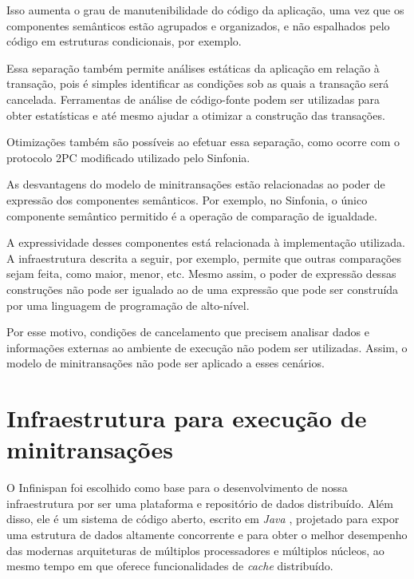 \documentclass[11pt,twoside,a4paper]{book}
\begin{document}
Isso aumenta o grau de manutenibilidade do código da aplicação, uma vez que os componentes semânticos estão agrupados e organizados, e não espalhados pelo código em estruturas condicionais, por exemplo.

Essa separação também permite análises estáticas da aplicação em relação à transação, pois é simples identificar as condições sob as quais a transação será cancelada. Ferramentas de análise de código-fonte podem ser utilizadas para obter estatísticas e até mesmo ajudar a otimizar a construção das transações.

Otimizações também são possíveis ao efetuar essa separação, como ocorre com o protocolo 2PC modificado utilizado pelo Sinfonia. 

As desvantagens do modelo de minitransações estão relacionadas ao poder de expressão dos componentes semânticos. Por exemplo, no Sinfonia, o único componente semântico permitido é a operação de comparação de igualdade.

A expressividade desses componentes está relacionada à implementação utilizada. A infraestrutura descrita a seguir, por exemplo, permite que outras comparações sejam feita, como maior, menor, etc. Mesmo assim, o poder de expressão dessas construções não pode ser igualado ao de uma expressão que pode ser construída por uma linguagem de programação de alto-nível.

Por esse motivo, condições de cancelamento que precisem analisar dados e informações externas ao ambiente de execução não podem ser utilizadas. Assim, o modelo de minitransações não pode ser aplicado a esses cenários.

\section{Infraestrutura para execução de minitransações}
\label{sec:infraestrutura_para_execucao_de_minitransacoes}



O Infinispan foi escolhido como base para o desenvolvimento de nossa infraestrutura por ser uma plataforma e repositório de dados distribuído. Além disso, ele é um sistema de código aberto, escrito em \emph{Java} \cite{java}, projetado para expor uma estrutura de dados altamente concorrente e para obter o melhor desempenho das modernas arquiteturas de múltiplos processadores e múltiplos núcleos, ao mesmo tempo em que oferece funcionalidades de \emph{cache} distribuído.
\end{document}
